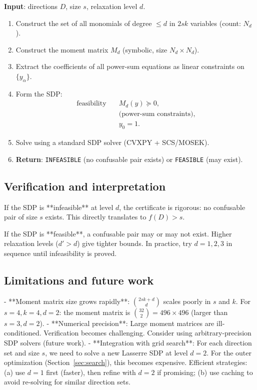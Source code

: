 \documentclass[12pt,a4paper]{article}
\begin{document}
\begin{algorithm}
\textbf{Input}: directions $D$, size $s$, relaxation level $d$.

\begin{enumerate}
  \item Construct the set of all monomials of degree $\leq d$ in $2sk$ variables (count: $N_d$).
  \item Construct the moment matrix $M_d$ (symbolic, size $N_d \times N_d$).
  \item Extract the coefficients of all power-sum equations as linear constraints on $\{y_\alpha\}$.
  \item Form the SDP:
    \begin{align*}
      \text{feasibility} \quad & M_d(y) \succeq 0, \\
      & \text{(power-sum constraints)}, \\
      & y_0 = 1.
    \end{align*}
  \item Solve using a standard SDP solver (CVXPY + SCS/MOSEK).
  \item \textbf{Return}: \texttt{INFEASIBLE} (no confusable pair exists) or \texttt{FEASIBLE} (may exist).
\end{enumerate}
\end{algorithm}

\subsection*{Verification and interpretation}

If the SDP is **infeasible** at level $d$, the certificate is rigorous: no confusable pair
of size $s$ exists.  This directly translates to $f(D) > s$.

If the SDP is **feasible**, a confusable pair may or may not exist.  Higher relaxation
levels ($d' > d$) give tighter bounds.  In practice, try $d=1,2,3$ in sequence until
infeasibility is proved.

\subsection*{Limitations and future work}

- **Moment matrix size grows rapidly**: $\binom{2sk+d}{d}$ scales poorly in $s$ and $k$.
  For $s=4, k=4, d=2$: the moment matrix is $\binom{32}{2} = 496 \times 496$ (larger than $s=3, d=2$).
- **Numerical precision**: Large moment matrices are ill-conditioned. Verification becomes
  challenging. Consider using arbitrary-precision SDP solvers (future work).
- **Integration with grid search**: For each direction set and size $s$, we need to solve
  a new Lasserre SDP at level $d=2$.  For the outer optimization (Section~\ref{sec:search}),
  this becomes expensive.  Efficient strategies: (a) use $d=1$ first (faster), then refine
  with $d=2$ if promising; (b) use caching to avoid re-solving for similar direction sets.
\end{document}

